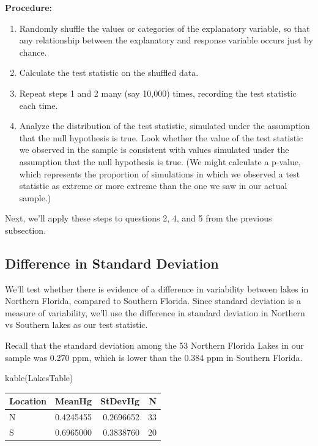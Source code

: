 \documentclass[
  letterpaper,
  DIV=11,
  numbers=noendperiod]{scrreprt}
\newenvironment{Shaded}{\begin{snugshade}}{\end{snugshade}}
\newcommand{\FunctionTok}[1]{\textcolor[rgb]{0.28,0.35,0.67}{#1}}
\newcommand{\NormalTok}[1]{\textcolor[rgb]{0.00,0.23,0.31}{#1}}
\begin{document}
\textbf{Procedure:}

\begin{enumerate}
\def\labelenumi{\arabic{enumi}.}
\item
  Randomly shuffle the values or categories of the explanatory variable,
  so that any relationship between the explanatory and response variable
  occurs just by chance.
\item
  Calculate the test statistic on the shuffled data.
\item
  Repeat steps 1 and 2 many (say 10,000) times, recording the test
  statistic each time.
\item
  Analyze the distribution of the test statistic, simulated under the
  assumption that the null hypothesis is true. Look whether the value of
  the test statistic we observed in the sample is consistent with values
  simulated under the assumption that the null hypothesis is true. (We
  might calculate a p-value, which represents the proportion of
  simulations in which we observed a test statistic as extreme or more
  extreme than the one we saw in our actual sample.)
\end{enumerate}

Next, we'll apply these steps to questions 2, 4, and 5 from the previous
subsection.

\subsection{Difference in Standard
Deviation}\label{difference-in-standard-deviation}

We'll test whether there is evidence of a difference in variability
between lakes in Northern Florida, compared to Southern Florida. Since
standard deviation is a measure of variability, we'll use the difference
in standard deviation in Northern vs Southern lakes as our test
statistic.

Recall that the standard deviation among the 53 Northern Florida Lakes
in our sample was 0.270 ppm, which is lower than the 0.384 ppm in
Southern Florida.

\begin{Shaded}
\begin{Highlighting}[]
\FunctionTok{kable}\NormalTok{(LakesTable)}
\end{Highlighting}
\end{Shaded}

\begin{longtable}[]{@{}lrrr@{}}
\toprule\noalign{}
Location & MeanHg & StDevHg & N \\
\midrule\noalign{}
\endhead
\bottomrule\noalign{}
\endlastfoot
N & 0.4245455 & 0.2696652 & 33 \\
S & 0.6965000 & 0.3838760 & 20 \\
\end{longtable}
\end{document}
